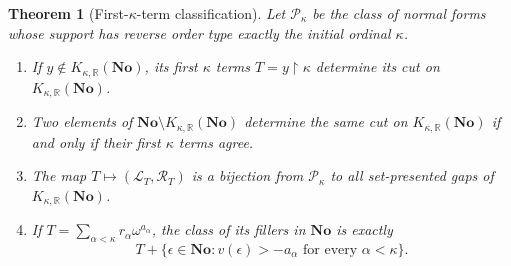 \documentclass[11pt,letterpaper]{article}
\numberwithin{equation}{section}
\newtheorem{theorem}{Theorem}[section]
\theoremstyle{definition}
\theoremstyle{remark}
\newcommand{\R}{\mathbb R}
\newcommand{\No}{\mathbf{No}}
\newcommand{\restr}{\mathbin{\upharpoonright}}
\newcommand{\KN}[2]{K_{#1,#2}(\No)}%
\begin{document}
\begin{theorem}[First-$\kappa$-term classification]\label{fkc:sb:thm:prefix}
Let $\mathcal P_\kappa$ be the class of normal forms whose support has reverse order type exactly the initial ordinal $\kappa$.
\begin{enumerate}[label=\textup{(\alph*)}]
\item If $y\notin\KN\kappa\R$, its first $\kappa$ terms $T=y\restr\kappa$ determine its cut on $\KN\kappa\R$.
\item Two elements of $\No\setminus\KN\kappa\R$ determine the same cut on $\KN\kappa\R$ if and only if their first $\kappa$ terms agree.
\item The map $T\mapsto(\mathcal L_T,\mathcal R_T)$ is a bijection from $\mathcal P_\kappa$ to all set-presented gaps of $\KN\kappa\R$.
\item If $T=\sum_{\alpha<\kappa}r_\alpha\omega^{a_\alpha}$, the class of its fillers in $\No$ is exactly
\begin{equation}\label{fkc:sb:eq:fillercone}
 T+\{\epsilon\in\No:v(\epsilon)>-a_\alpha
                         \text{ for every }\alpha<\kappa\}.
\end{equation}
\end{enumerate}
\end{theorem}
\end{document}
